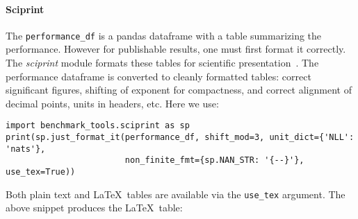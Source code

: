 \documentclass{article}
\newcommand{\code}{\texttt}
\begin{document}
\paragraph{Sciprint}
The \code{performance\_df} is a pandas dataframe with a table summarizing the performance.
However for publishable results, one must first format it correctly.
The \emph{sciprint} module formats these tables for scientific presentation~\citep{Cole2015}.
The performance dataframe is converted to cleanly formatted tables: correct significant figures, shifting of exponent for compactness, and correct alignment of decimal points, units in headers, etc.
Here we use:
\vspace{-2mm}
\begin{verbatim}
import benchmark_tools.sciprint as sp
print(sp.just_format_it(performance_df, shift_mod=3, unit_dict={'NLL': 'nats'},
                        non_finite_fmt={sp.NAN_STR: '{--}'}, use_tex=True))
\end{verbatim}
\vspace{-2mm}
Both plain text and \LaTeX\ tables are available via the \code{use\_tex} argument.
The above snippet produces the \LaTeX\ table:
\end{document}
